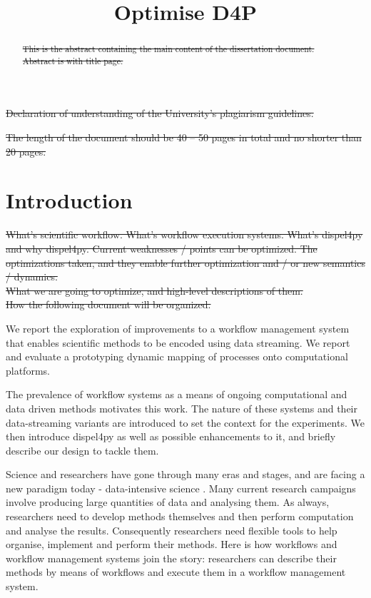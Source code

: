 \documentclass[•]{article}
\title{Optimise D4P}
\begin{document}
	\maketitle
	\begin{abstract}
	\sout{This is the abstract containing the main content of the dissertation document. Abstract is with title page.}
	\end{abstract}
	\pagebreak
	
	\sout{Declaration of understanding of the University's plagiarism guidelines.	}
	
	\pagebreak	
	
	\sout{The length of the document should be 40 -- 50 pages in total and no shorter than 20 pages.}
	\section{Introduction}
	\sout{What's scientific workflow. What's workflow execution systems. What's dispel4py and why dispel4py. Current weaknesses / points can be optimized. The optimizations taken, and they enable further optimization and / or new semantics / dynamics. \\
	What we are going to optimize, and high-level descriptions of them. \\
	How the following document will be organized.}
	
	We report the exploration of improvements to a workflow management system that enables scientific methods to be encoded using data streaming. We report and evaluate a prototyping dynamic mapping of processes onto computational platforms.
	
	The prevalence of workflow systems as a means of ongoing computational and data driven methods motivates this work. The nature of these systems and their data-streaming variants are introduced to set the context for the experiments. We then introduce dispel4py as well as possible enhancements to it, and briefly describe our design to tackle them.
	
	Science and researchers have gone through many eras and stages, and are facing a new paradigm today - data-intensive science \cite{hey2009fourth}. Many current research campaigns involve producing large quantities of data and analysing them. As always, researchers need to develop methods themselves and then perform computation and analyse the results. Consequently researchers need flexible tools to help organise, implement and perform their methods. Here is how workflows and workflow management systems join the story: researchers can describe their methods by means of workflows and execute them in a workflow management system.
	
\end{document}

